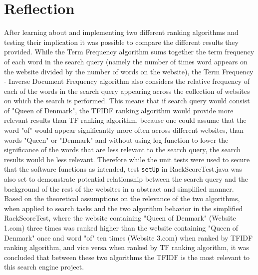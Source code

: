 \section{Reflection}
After learning about and implementing two different ranking algorithms and testing their implication it was possible to compare the different results they provided. 
While the Term Frequency algorithm sums together the term frequency of each word in the search query (namely the number of times word appears on the website divided by the number of words on the website), the Term Frequency - Inverse Document Frequency algorithm also considers the relative frequency of each of the words in the search query appearing across the collection of websites on which the search is performed. This means that if search query would consist of "Queen of Denmark", the TFIDF ranking algorithm would provide more relevant results than TF ranking algorithm, because one could assume that the word "of" would appear significantly more often across different websites, than words "Queen" or "Denmark" and without using log function to lower the significance of the words that are less relevant to the search query, the search results would be less relevant. Therefore while the  unit tests were used to secure that the software functions as intended, test {\tt setUp} in RackScoreTest.java was also set to demonstrate potential relationship between the search query and the background of the rest of the websites in a abstract and simplified manner.\\
Based on the theoretical assumptions on the relevance of the two algorithms, when applied to search tasks and the two algorithm behavior in the simplified RackScoreTest, where the website containing "Queen of Denmark" (Website 1.com) three times was ranked higher than the website containing "Queen of Denmark" once and word "of" ten times (Website 3.com) when ranked by TFIDF ranking algorithm, and vice versa when ranked by TF ranking algorithm,  it was concluded that between these two algorithms the TFIDF is the most relevant to this search engine project. 


